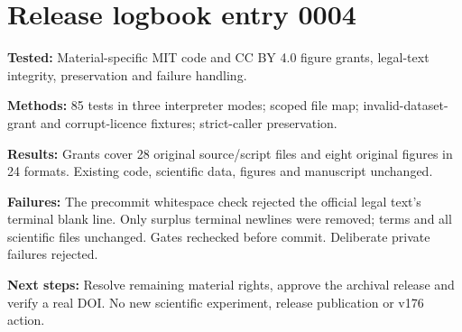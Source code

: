 \section*{Release logbook entry 0004}
\textbf{Tested:} Material-specific MIT code and CC BY 4.0 figure grants, legal-text integrity, preservation and failure handling.

\textbf{Methods:} 85 tests in three interpreter modes; scoped file map; invalid-dataset-grant and corrupt-licence fixtures; strict-caller preservation.

\textbf{Results:} Grants cover 28 original source/script files and eight original figures in 24 formats. Existing code, scientific data, figures and manuscript unchanged.

\textbf{Failures:} The precommit whitespace check rejected the official legal text's terminal blank line. Only surplus terminal newlines were removed; terms and all scientific files unchanged. Gates rechecked before commit. Deliberate private failures rejected.

\textbf{Next steps:} Resolve remaining material rights, approve the archival release and verify a real DOI. No new scientific experiment, release publication or v176 action.
